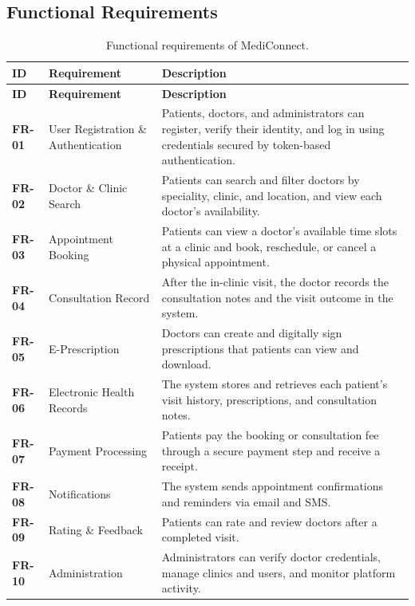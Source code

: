 \documentclass[12pt,a4paper]{article}
\begin{document}
\subsection{Functional Requirements}
\begin{longtable}{>{\bfseries}p{1.6cm} p{3.2cm} p{8.2cm}}
\caption{Functional requirements of MediConnect.}\\
\toprule
\textbf{ID} & \textbf{Requirement} & \textbf{Description}\\
\midrule
\endfirsthead
\toprule
\textbf{ID} & \textbf{Requirement} & \textbf{Description}\\
\midrule
\endhead
FR-01 & User Registration \& Authentication & Patients, doctors, and administrators can
register, verify their identity, and log in using credentials secured by token-based
authentication.\\
FR-02 & Doctor \& Clinic Search & Patients can search and filter doctors by speciality, clinic,
and location, and view each doctor's availability.\\
FR-03 & Appointment Booking & Patients can view a doctor's available time slots at a clinic and
book, reschedule, or cancel a physical appointment.\\
FR-04 & Consultation Record & After the in-clinic visit, the doctor records the consultation
notes and the visit outcome in the system.\\
FR-05 & E-Prescription & Doctors can create and digitally sign prescriptions that patients can
view and download.\\
FR-06 & Electronic Health Records & The system stores and retrieves each patient's visit
history, prescriptions, and consultation notes.\\
FR-07 & Payment Processing & Patients pay the booking or consultation fee through a secure
payment step and receive a receipt.\\
FR-08 & Notifications & The system sends appointment confirmations and reminders via email and
SMS.\\
FR-09 & Rating \& Feedback & Patients can rate and review doctors after a completed visit.\\
FR-10 & Administration & Administrators can verify doctor credentials, manage clinics and
users, and monitor platform activity.\\
\bottomrule
\end{longtable}
\end{document}
